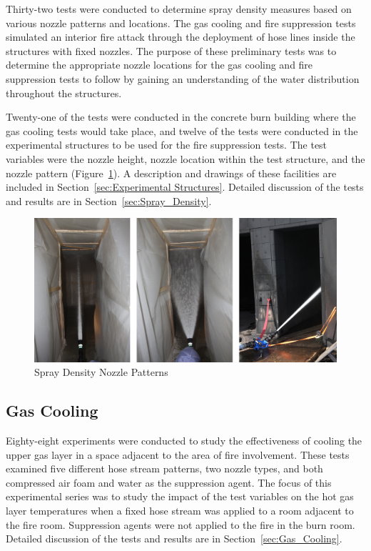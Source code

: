 \documentclass[12pt,oneside]{book}
\begin{document}
Thirty-two tests were conducted to determine spray density measures based on various nozzle patterns and locations. The gas cooling and fire suppression tests simulated an interior fire attack through the deployment of hose lines inside the structures with fixed nozzles. The purpose of these preliminary tests was to determine the appropriate nozzle locations for the gas cooling and fire suppression tests to follow by gaining an understanding of the water distribution throughout the structures.

Twenty-one of the tests were conducted in the concrete burn building where the gas cooling tests would take place, and twelve of the tests were conducted in the experimental structures to be used for the fire suppression tests. The test variables were the nozzle height, nozzle location within the test structure, and the nozzle pattern (Figure~\ref{fig:Spray_Density_Nozzle_Patterns}). A description and drawings of these facilities are included in Section~\ref{sec:Experimental Structures}. Detailed discussion of the tests and results are in Section~\ref{sec:Spray_Density}.

\begin{figure}[!ht]
	\includegraphics[width=6in]{../Figures/Pictures/Flows}
	\caption{Spray Density Nozzle Patterns}
	\label{fig:Spray_Density_Nozzle_Patterns}
\end{figure}

\subsection{Gas Cooling}
\label{sec:desc_Gas_Cooling}

Eighty-eight experiments were conducted to study the effectiveness of cooling the upper gas layer in a space adjacent to the area of fire involvement. These tests examined five different hose stream patterns, two nozzle types, and both compressed air foam and water as the suppression agent. The focus of this experimental series was to study the impact of the test variables on the hot gas layer temperatures when a fixed hose stream was applied to a room adjacent to the fire room. Suppression agents were not applied to the fire in the burn room.  Detailed discussion of the tests and results are in Section~\ref{sec:Gas_Cooling}.
\end{document}
